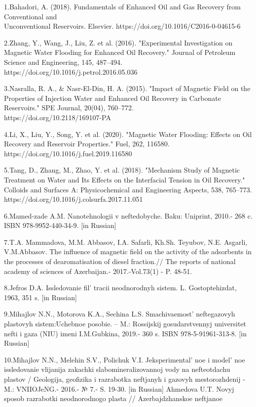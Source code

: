 \begin{references}
1.Bahadori, A. (2018). Fundamentals of Enhanced Oil and Gas Recovery
from Conventional and \\Unconventional Reservoirs. Elsevier.
https://doi.org/10.1016/C2016-0-04615-6

2.Zhang, Y., Wang, J., Liu, Z. et al. (2016). "Experimental
Investigation on Magnetic Water Flooding for Enhanced Oil Recovery."
Journal of Petroleum Science and Engineering, 145, 487--494.\\
https://doi.org/10.1016/j.petrol.2016.05.036

3.Nasralla, R. A., \& Nasr-El-Din, H. A. (2015). "Impact of Magnetic
Field on the Properties of Injection Water and Enhanced Oil Recovery in
Carbonate Reservoirs." SPE Journal, 20(04), 760--772.\\
https://doi.org/10.2118/169107-PA

4.Li, X., Liu, Y., Song, Y. et al. (2020). "Magnetic Water Flooding:
Effects on Oil Recovery and Reservoir Properties." Fuel, 262, 116580.
https://doi.org/10.1016/j.fuel.2019.116580

5.Tang, D., Zhang, M., Zhao, Y. et al. (2018). "Mechanism Study of
Magnetic Treatment on Water and Its Effects on the Interfacial Tension
in Oil Recovery." Colloids and Surfaces A: Physicochemical and
Engineering Aspects, 538, 765--773.
https://doi.org/10.1016/j.colsurfa.2017.11.051

6.Mamed-zade A.M. Nanotehnologii v neftedobyche. Baku: Uniprint, 2010.-
268 c. ISBN 978-9952-440-34-9. {[}in Russian{]}

7.T.A. Mammadova, M.M. Abbasov, I.A. Safarli, Kh.Sh. Teyubov, N.E.
Asgarli, V.M.Abbasov. The influence of magnetic field on the activity of
the adsorbents in the processes of dearomatisation of diesel fraction.//
The reports of national academy of sciences of Azerbaijan.-
2017.-Vol.73(1) - P. 48-51.

8.Jefros D.A. Issledovanie fil' tracii neodnorodnyh
sistem. L. Gostoptehizdat, 1963, 351 s. {[}in Russian{]}

9.Mihajlov N.N., Motorova K.A., Sechina L.S.
Smachivaemost'{} neftegazovyh plastovyh sistem:Uchebnoe
posobie. -- M.: Rossijskij gosudarstvennyj universitet nefti i gaza
(NIU) imeni I.M.Gubkina, 2019.- 360 s. ISBN 978-5-91961-313-8. {[}in
Russian{]}

10.Mihajlov N.N., Melehin S.V., Polichuk V.I.
Jeksperimental' noe i model' noe
issledovanie vlijanija zakachki slabomineralizovannoj vody na
nefteotdachu plastov / Geologija, geofizika i razrabotka neftjanyh i
gazovyh mestorozhdenij -M.: VNIIOJeNG.- 2016.- № 7.- S. 19-30. {[}in
Russian{]} Ahmedova U.T. Novyj sposob razrabotki neodnorodnogo plasta //
Azerbajdzhanskoe neftjanoe


\end{references}

